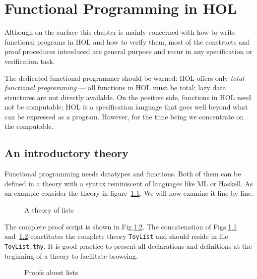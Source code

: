 \chapter{Functional Programming in HOL}

Although on the surface this chapter is mainly concerned with how to write
functional programs in HOL and how to verify them, most of the
constructs and proof procedures introduced are general purpose and recur in
any specification or verification task.

The dedicated functional programmer should be warned: HOL offers only
\emph{total functional programming} --- all functions in HOL must be total;
lazy data structures are not directly available. On the positive side,
functions in HOL need not be computable: HOL is a specification language that
goes well beyond what can be expressed as a program. However, for the time
being we concentrate on the computable.

\section{An introductory theory}
\label{sec:intro-theory}

Functional programming needs datatypes and functions. Both of them can be
defined in a theory with a syntax reminiscent of languages like ML or
Haskell. As an example consider the theory in figure~\ref{fig:ToyList}.
We will now examine it line by line.

\begin{figure}[htbp]
\begin{ttbox}\makeatother
\end{ttbox}
\caption{A theory of lists}
\label{fig:ToyList}
\end{figure}

{\makeatother}

The complete proof script is shown in Fig.\ts\ref{fig:ToyList-proofs}. The
concatenation of Figs.\ts\ref{fig:ToyList} and~\ref{fig:ToyList-proofs}
constitutes the complete theory \texttt{ToyList} and should reside in file
\texttt{ToyList.thy}. It is good practice to present all declarations and
definitions at the beginning of a theory to facilitate browsing.

\begin{figure}[htbp]
\begin{ttbox}\makeatother
\end{ttbox}
\caption{Proofs about lists}
\label{fig:ToyList-proofs}
\end{figure}

